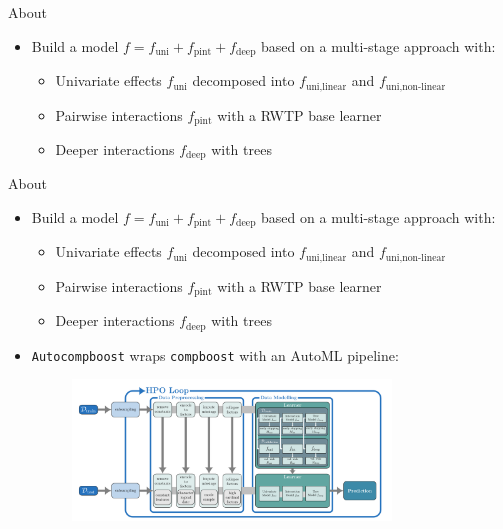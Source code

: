 \documentclass[t,10pt]{beamer}
\begin{document}
\begin{frame}{About}
  \begin{itemize}
    \item Build a model $f = f_{\text{uni}} + f_{\text{pint}} + f_{\text{deep}}$ based on a multi-stage approach with:
      \begin{itemize}
        \item Univariate effects $f_{\text{uni}}$ decomposed into $f_{\text{uni,linear}}$ and $f_{\text{uni,non-linear}}$
        \item Pairwise interactions $f_{\text{pint}}$ with a RWTP base learner
        \item Deeper interactions $f_{\text{deep}}$ with trees
      \end{itemize}
  \end{itemize}
\end{frame}

\begin{frame}{About}
  \begin{itemize}
    \item Build a model $f = f_{\text{uni}} + f_{\text{pint}} + f_{\text{deep}}$ based on a multi-stage approach with:
      \begin{itemize}
        \item Univariate effects $f_{\text{uni}}$ decomposed into $f_{\text{uni,linear}}$ and $f_{\text{uni,non-linear}}$
        \item Pairwise interactions $f_{\text{pint}}$ with a RWTP base learner
        \item Deeper interactions $f_{\text{deep}}$ with trees
      \end{itemize}
    \item \texttt{Autocompboost} wraps \texttt{compboost} with an AutoML pipeline:
      \begin{figure}
        \centering
        \includegraphics[width=0.8\textwidth]{figures/fig-acwb-ml-pipeline.png}
      \end{figure}
  \end{itemize}
	\addtocounter{framenumber}{-1}
\end{frame}
\end{document}
